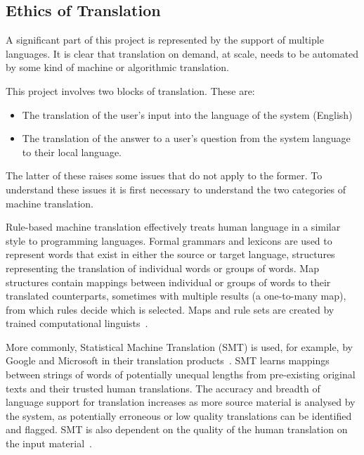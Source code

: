 \documentclass[authoryearcitations]{UoYCSproject}
\begin{document}

\subsection{Ethics of Translation}
\label{subsec:ethicsOfTranslation}
A significant part of this project is represented by the support of multiple languages.  It is clear that translation on demand, at scale, needs to be automated by some kind of machine or algorithmic translation.

This project involves two blocks of translation.  These are:
\begin{itemize}
  \item The translation of the user's input into the language of the system (English)
  \item The translation of the answer to a user's question from the system language to their local language.
\end{itemize}
The latter of these raises some issues that do not apply to the former. To understand these issues it is first necessary to understand the two categories of machine translation.

Rule-based machine translation effectively treats human language in a similar style to programming languages.  Formal grammars and lexicons are used to represent words that exist in either the source or target language, structures representing the translation of individual words or groups of words.  Map structures contain mappings between individual or groups of words to their translated counterparts, sometimes with multiple results (a one-to-many map), from which rules decide which is selected.  Maps and rule sets are created by trained computational linguists~\cite{kenny2011ethics}.

More commonly, Statistical Machine Translation (SMT) is used, for example, by Google and Microsoft in their translation products~\cite{kenny2011ethics, Google_Translate_Research}.  SMT learns mappings between strings of words of potentially unequal lengths from pre-existing original texts and their trusted human translations.  The accuracy and breadth of language support for translation increases as more source material is analysed by the system, as potentially erroneous or low quality translations can be identified and flagged.  SMT is also dependent on the quality of the human translation on the input material~\cite{kenny2011ethics}.
\end{document}
